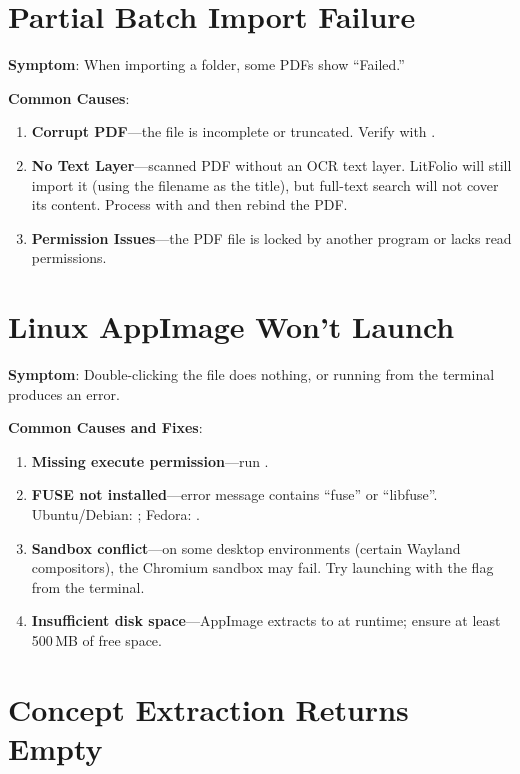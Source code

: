 \section{Partial Batch Import Failure}

\textbf{Symptom}: When importing a folder, some PDFs show ``Failed.''

\textbf{Common Causes}:

\begin{enumerate}
  \item \textbf{Corrupt PDF}---the file is incomplete or truncated. Verify with
    .
  \item \textbf{No Text Layer}---scanned PDF without an OCR text layer. LitFolio will
    still import it (using the filename as the title), but full-text search will not
    cover its content. Process with  and then rebind the PDF.
  \item \textbf{Permission Issues}---the PDF file is locked by another program or
    lacks read permissions.
\end{enumerate}

\section{Linux AppImage Won't Launch}

\textbf{Symptom}: Double-clicking the  file does nothing, or running
from the terminal produces an error.

\textbf{Common Causes and Fixes}:

\begin{enumerate}
  \item \textbf{Missing execute permission}---run
    .
  \item \textbf{FUSE not installed}---error message contains ``fuse'' or ``libfuse''.
    Ubuntu/Debian: ;
    Fedora: .
  \item \textbf{Sandbox conflict}---on some desktop environments (certain Wayland
    compositors), the Chromium sandbox may fail. Try launching with the
     flag from the terminal.
  \item \textbf{Insufficient disk space}---AppImage extracts to  at
    runtime; ensure at least 500\,MB of free space.
\end{enumerate}

\section{Concept Extraction Returns Empty}

